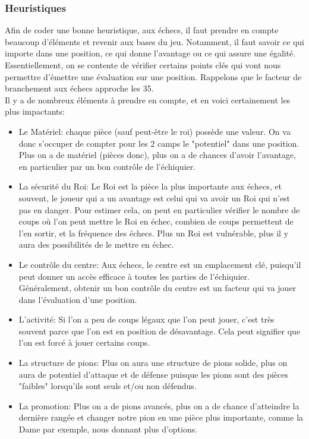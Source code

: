 \documentclass{article}
\begin{document}
\subsubsection{Heuristiques}
Afin de coder une bonne heuristique, aux échecs, il faut prendre en compte beaucoup d'éléments et revenir aux bases du jeu.
Notamment, il faut savoir ce qui importe dans une position, ce qui donne l'avantage ou ce qui assure une égalité. Essentiellement,
on se contente de vérifier certains points clés qui vont nous permettre d'émettre une évaluation sur une position.
Rappelons que le facteur de branchement aux échecs approche les 35.\\
Il y a de nombreux éléments à prendre en compte, et en voici certainement les plus impactants:
\begin{itemize}
    \item Le Matériel: chaque pièce (sauf peut-être le roi) possède une valeur. On va donc s'occuper de compter pour les 2 camps le "potentiel"
    dans une position. Plus on a de matériel (pièces donc), plus on a de chances d'avoir l'avantage, en particulier par un bon contrôle de l'échiquier.
    \item La sécurité du Roi: Le Roi est la pièce la plus importante aux échecs, et souvent, le joueur qui a un avantage est celui qui va
    avoir un Roi qui n'est pas en danger. Pour estimer cela, on peut en particulier vérifier le nombre de coups où l'on peut mettre le Roi en échec,
    combien de coups permettent de l'en sortir, et la fréquence des échecs. Plus un Roi est vulnérable, plus il y aura des possibilités
    de le mettre en échec.
    \item Le contrôle du centre: Aux échecs, le centre est un emplacement clé, puisqu'il peut donner un accès efficace à toutes les parties de
    l'échiquier. Généralement, obtenir un bon contrôle du centre est un facteur qui va jouer dans l'évaluation d'une position.
    \item L'activité: Si l'on a peu de coups légaux que l'on peut jouer, c'est très souvent parce que l'on est en position de désavantage. Cela peut
    signifier que l'on est forcé à jouer certains coups.
    \item La structure de pions: Plus on aura une structure de pions solide, plus on aura de potentiel d'attaque et de défense puisque les pions sont
    des pièces "faibles" lorsqu'ils sont seuls et/ou non défendus.
    \item La promotion: Plus on a de pions avancés, plus on a de chance d'atteindre la dernière rangée et changer notre pion en une pièce plus importante,
    comme la Dame par exemple, nous donnant plus d'options.
\end{itemize}
\end{document}
